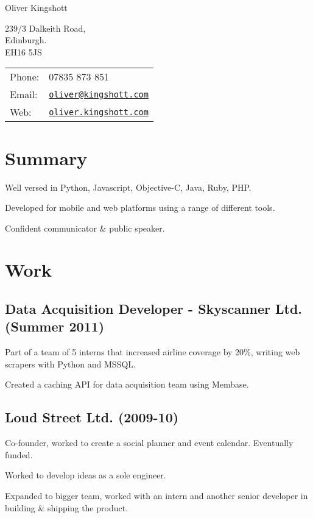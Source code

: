 \documentclass[a4paper]{article}
\def\name{Oliver Kingshott}
\renewenvironment{itemize}{
  \begin{list}{}{
    \setlength{\leftmargin}{1.5em}
  }
}{
  \end{list}
}
\begin{document}
{\huge \name}

\vspace{0.25in}

\begin{minipage}{0.45\linewidth}
  239/3 Dalkeith Road, \\
  Edinburgh. \\
  EH16 5JS
\end{minipage}
\begin{minipage}{0.45\linewidth}
  \begin{tabular}{ll}
    Phone: & 07835 873 851 \\
    Email: & \href{mailto:oliver@kingshott.com}{\tt oliver@kingshott.com} \\
    Web: & \href{http://oliver.kingshott.com/}{\tt oliver.kingshott.com} \\
  \end{tabular}
\end{minipage}

\section*{Summary}
\begin{itemize}
  \item Well versed in Python, Javascript, Objective-C, Java, Ruby, PHP. 
  \item Developed for mobile and web platforms using a range of different tools.
  \item Confident communicator \& public speaker.
\end{itemize}

\section*{Work}

\subsection*{Data Acquisition Developer - Skyscanner Ltd. (Summer 2011)}
\begin{itemize}
  \item Part of a team of 5 interns that increased airline coverage by 20\%, writing web scrapers with Python and MSSQL.
  \item Created a caching API for data acquisition team using Membase.
\end{itemize}

\subsection*{Loud Street Ltd. (2009-10)}
\begin{itemize}
  \item Co-founder, worked to create a social planner and event calendar. Eventually funded.
  \item Worked to develop ideas as a sole engineer.
  \item Expanded to bigger team, worked with an intern and another senior developer in building \& shipping the product.
\end{itemize}
\end{document}
